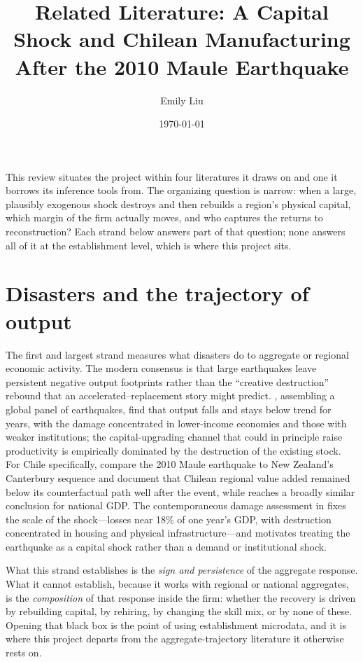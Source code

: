 \documentclass[12pt]{article}
\title{Related Literature: A Capital Shock and Chilean Manufacturing\\
After the 2010 Maule Earthquake}
\author{Emily Liu}
\date{\today}
\begin{document}
\maketitle

\noindent This review situates the project within four literatures it draws on and one it
borrows its inference tools from. The organizing question is narrow: when a large, plausibly
exogenous shock destroys and then rebuilds a region's physical capital, which margin of the
firm actually moves, and who captures the returns to reconstruction? Each strand below answers
part of that question; none answers all of it at the establishment level, which is where this
project sits.

\section{Disasters and the trajectory of output}

The first and largest strand measures what disasters do to aggregate or regional economic
activity. The modern consensus is that large earthquakes leave persistent negative output
footprints rather than the ``creative destruction'' rebound that an accelerated--replacement
story might predict. \citet{aksoy2024}, assembling a global panel of earthquakes, find that
output falls and stays below trend for years, with the damage concentrated in lower-income
economies and those with weaker institutions; the capital-upgrading channel that could in
principle raise productivity is empirically dominated by the destruction of the existing stock.
For Chile specifically, \citet{diaz2024} compare the 2010 Maule earthquake to New Zealand's
Canterbury sequence and document that Chilean regional value added remained below its
counterfactual path well after the event, while \citet{benguria2022} reaches a broadly similar
conclusion for national GDP. The contemporaneous damage assessment in \citet{eclac2010} fixes
the scale of the shock---losses near 18\% of one year's GDP, with destruction concentrated in
housing and physical infrastructure---and motivates treating the earthquake as a capital shock
rather than a demand or institutional shock.

What this strand establishes is the \emph{sign and persistence} of the aggregate response. What
it cannot establish, because it works with regional or national aggregates, is the
\emph{composition} of that response inside the firm: whether the recovery is driven by
rebuilding capital, by rehiring, by changing the skill mix, or by none of these. Opening that
black box is the point of using establishment microdata, and it is where this project departs
from the aggregate-trajectory literature it otherwise rests on.
\end{document}
